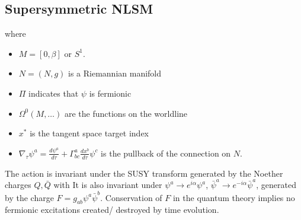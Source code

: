 \documentclass{article}
\begin{document}
\subsection{Supersymmetric NLSM}

where 
\begin{itemize}
\item $M=[0,\beta]$ or $S^1$.
\item $N=(N,g)$ is a Riemannian manifold
    \item $\Pi$ indicates that $\psi$ is fermionic 
    \item $\Omega^0(M,\dots)$ are the functions on the worldline
    \item $x^\ast$ is the tangent space target index 
    \item $\nabla_\tau \psi^a = \frac{d\psi^a}{d\tau} + \Gamma^a_{bc} \frac{dx^b}{d\tau} \psi^c$ is the pullback of the connection on $N$. 
\end{itemize}
The action is invariant under the SUSY transform 
generated by the Noether charges $Q,\bar{Q}$ with 
It is also invariant under $\psi^a \to e^{i\alpha} \psi^a$, $\bar{\psi}^a \to e^{-i\alpha} \bar{\psi}^a$, generated by the charge $F=g_{ab} \psi^a \bar{\psi}^b$. Conservation of $F$ in the quantum theory implies no fermionic excitations created/ destroyed by time evolution. 

\end{document}
